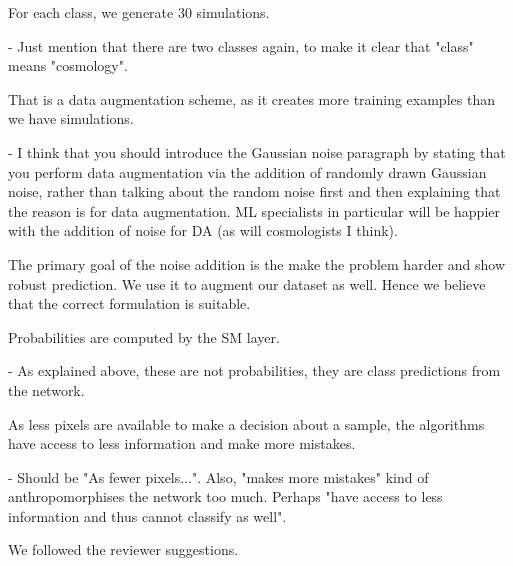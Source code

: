 \documentclass[12pt,a4paper]{article}
\newcommand{\nati}[1]{{\color[rgb]{.1,.6,.1}{NP: #1}}}
\newcommand{\TK}[1]{{\color{red}{TK: #1}}}
\newcommand{\todo}[1]{{\color[rgb]{.6,.1,.6}{TODO: #1}}}
\newcommand{\1}{\b{1}}              %
\newcommand{\0}{\b{0}}              %
\begin{document}
\begin{mdframed}[style=comment]
For each class, we generate 30 simulations.

- Just mention that there are two classes again, to make it clear that "class" means "cosmology".
\end{mdframed}
\TK{Updated the sentence.}

\begin{mdframed}[style=comment]
That is a data augmentation scheme, as it creates more training examples than we have simulations.

- I think that you should introduce the Gaussian noise paragraph by stating that you perform data augmentation via the addition of randomly drawn Gaussian noise, rather than talking about the random noise first and then explaining that the reason is for data augmentation. ML specialists in particular will be happier with the addition of noise for DA (as will cosmologists I think).
\end{mdframed}
\todo{Assign: @all}
\nati{I think that the primary goal of adding noise is the make the problem harder, and show robust prediction, not the make the dataset larger... Hence I disagree with the reviewer. What do you think?}
\TK{This is an interesting observation. The noise is introduced to make the case realistic, as the mass map data in reality is always very noisy. It is convenient that this fact can be used for data augmentation too and make the ML problem easier to solve. As these two facts are connected, we prefer to leave the sentence as is.}

The primary goal of the noise addition is the make the problem harder and show robust prediction. We use it to augment our dataset as well. Hence we believe that the correct formulation is suitable.

\begin{mdframed}[style=comment]
Probabilities are computed by the SM layer.

- As explained above, these are not probabilities, they are class predictions from the network.
\end{mdframed}
\todo{Assigned @michael}
\nati{Should we simply say "normalized network score"? I do not know...}

\begin{mdframed}[style=comment]
As less pixels are available to make a decision about a sample, the algorithms have access to less information and make more mistakes.

- Should be "As fewer pixels...". Also, "makes more mistakes" kind of anthropomorphises the network too much. Perhaps "have access to less information and thus cannot classify as well".
\end{mdframed}
We followed the reviewer suggestions.
\end{document}
